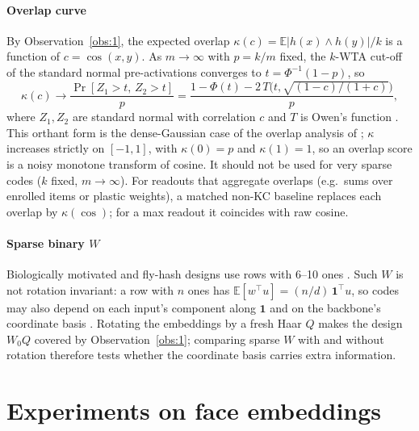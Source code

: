 \documentclass[preprint,12pt,authoryear]{elsarticle}
\theoremstyle{remark}
\newcommand{\E}{\mathbb{E}}
\begin{document}
\paragraph{Overlap curve} By Observation~\ref{obs:1}, the expected overlap $\kappa(c)=\E|h(x)\wedge h(y)|/k$
is a function of $c=\cos(x,y)$. As $m\to\infty$ with $p=k/m$ fixed, the $k$-WTA cut-off of the standard normal
pre-activations converges to $t=\Phi^{-1}(1-p)$, so
\begin{equation}\label{eq:kappa}
\kappa(c)\to \frac{\Pr[Z_1>t,\,Z_2>t]}{p}=\frac{1-\Phi(t)-2\,T\!\big(t,\sqrt{(1-c)/(1+c)}\big)}{p},
\end{equation}
where $Z_1,Z_2$ are standard normal with correlation $c$ and $T$ is Owen's function \citep{owen1956}. This orthant form is the dense-Gaussian case of the overlap analysis
of \citet{babadi2014}; $\kappa$ increases strictly on $[-1,1]$, with $\kappa(0)=p$ and $\kappa(1)=1$, so an overlap score is a noisy
monotone transform of cosine. It should not be used for very sparse codes ($k$ fixed, $m\to\infty$). For
readouts that aggregate overlaps (e.g.\ sums over enrolled items or plastic weights), a matched non-KC baseline
replaces each overlap by $\kappa(\cos)$; for a max readout it coincides with raw cosine.

\paragraph{Sparse binary $W$} Biologically motivated and fly-hash designs use rows with 6--10 ones
\citep{dasgupta2017,caron2013}. Such $W$ is not rotation invariant: a row with $n$ ones has
$\E[w^\top u]=(n/d)\,\mathbf 1^\top u$, so codes may also depend on each input's component along $\mathbf 1$ and
on the backbone's coordinate basis \citep{sharma2018}. Rotating the embeddings by a fresh Haar $Q$ makes the
design $W_0Q$ covered by Observation~\ref{obs:1}; comparing sparse $W$ with and without rotation therefore tests
whether the coordinate basis carries extra information.

\section{Experiments on face embeddings}\label{sec:exp}
\end{document}
